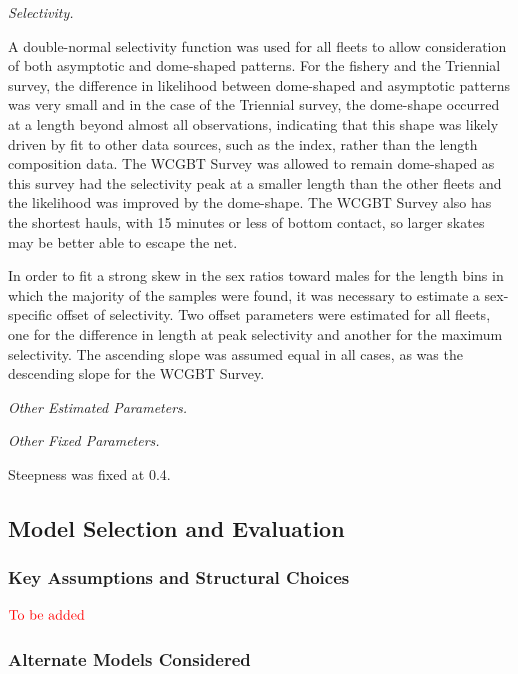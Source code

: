 \documentclass[12pt,]{article}
\begin{document}
\emph{Selectivity.}

A double-normal selectivity function was used for all fleets to allow
consideration of both asymptotic and dome-shaped patterns. For the
fishery and the Triennial survey, the difference in likelihood between
dome-shaped and asymptotic patterns was very small and in the case of
the Triennial survey, the dome-shape occurred at a length beyond almost
all observations, indicating that this shape was likely driven by fit to
other data sources, such as the index, rather than the length
composition data. The WCGBT Survey was allowed to remain dome-shaped as
this survey had the selectivity peak at a smaller length than the other
fleets and the likelihood was improved by the dome-shape. The WCGBT
Survey also has the shortest hauls, with 15 minutes or less of bottom
contact, so larger skates may be better able to escape the net.

In order to fit a strong skew in the sex ratios toward males for the
length bins in which the majority of the samples were found, it was
necessary to estimate a sex-specific offset of selectivity. Two offset
parameters were estimated for all fleets, one for the difference in
length at peak selectivity and another for the maximum selectivity. The
ascending slope was assumed equal in all cases, as was the descending
slope for the WCGBT Survey.

\emph{Other Estimated Parameters.}

\emph{Other Fixed Parameters.}

Steepness was fixed at 0.4.

\hypertarget{model-selection-and-evaluation}{%
\subsection{Model Selection and
Evaluation}\label{model-selection-and-evaluation}}

\hypertarget{key-assumptions-and-structural-choices}{%
\subsubsection{Key Assumptions and Structural
Choices}\label{key-assumptions-and-structural-choices}}

\textbf{\(\color{red}{\text{To be added}}\)}

\hypertarget{alternate-models-considered}{%
\subsubsection{Alternate Models
Considered}\label{alternate-models-considered}}
\end{document}
